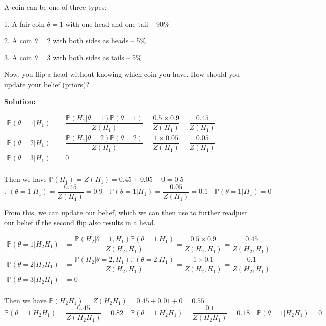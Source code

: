 \begin{eg}
  A coin can be one of three types:

  1. A fair coin \(\theta = 1\) with one head and one tail – 90\%

  2. A coin \(\theta = 2\) with both sides as heads – 5\%
  
  3. A coin \(\theta = 3\) with both sides as tails – 5\%

  Now, you flip a head without knowing which coin you have. How should you update your belief (priors)?

  \textbf{Solution:} 

  \(
  \begin{aligned}
    \mathbb{P}(\theta = 1 \vert H_1) &= \dfrac{\mathbb{P}(H_1 \vert \theta = 1)\mathbb{P}(\theta = 1)}{Z(H_1)} = \dfrac{0.5 \times 0.9}{Z(H_1)} = \dfrac{0.45}{Z(H_1)} \\
    \mathbb{P}(\theta = 2 \vert H_1) &= \dfrac{\mathbb{P}(H_1 \vert \theta = 2)\mathbb{P}(\theta = 2)}{Z(H_1)} = \dfrac{1 \times 0.05}{Z(H_1)} = \dfrac{0.05}{Z(H_1)} \\
    \mathbb{P}(\theta = 3 \vert H_1) &= 0 \\
  \end{aligned}
  \) 

  Then we have \(\mathbb{P}(H_1) = Z(H_1) = 0.45 + 0.05 + 0 = 0.5\) 
  \[
    \mathbb{P}(\theta = 1 \vert H_1) = \dfrac{0.45}{Z(H_1)} = 0.9 \quad \mathbb{P}(\theta = 1 \vert H_1) = \dfrac{0.05}{Z(H_1)} = 0.1 \quad \mathbb{P}(\theta = 1 \vert H_1) = 0
  \]

  From this, we can update our belief, which we can then use to further readjust our belief if the second flip also results in a head. 

  \(
  \begin{aligned}
    \mathbb{P}(\theta = 1 \vert H_2 H_1) &= \dfrac{\mathbb{P}(H_2 \vert \theta = 1, H_1)\mathbb{P}(\theta = 1 \vert H_1)}{Z(H_2, H_1)} = \dfrac{0.5 \times 0.9}{Z(H_2, H_1)} = \dfrac{0.45}{Z(H_2, H_1)} \\
    \mathbb{P}(\theta = 2 \vert H_2 H_1) &= \dfrac{\mathbb{P}(H_2 \vert \theta = 2, H_1)\mathbb{P}(\theta = 2 \vert H_1)}{Z(H_2, H_1)} = \dfrac{1 \times 0.1}{Z(H_2, H_1)} = \dfrac{0.1}{Z(H_2, H_1)} \\
    \mathbb{P}(\theta = 3 \vert H_2 H_1) &= 0 \\
  \end{aligned}
  \) 

  Then we have \(\mathbb{P}(H_2 H_1) = Z(H_2 H_1) = 0.45 + 0.01 + 0 = 0.55\) 
  \[
    \mathbb{P}(\theta = 1 \vert H_2 H_1) = \dfrac{0.45}{Z(H_2 H_1)} = 0.82 \quad \mathbb{P}(\theta = 1 \vert H_2 H_1) = \dfrac{0.1}{Z(H_2 H_1)} = 0.18 \quad \mathbb{P}(\theta = 1 \vert H_2 H_1) = 0
  \]
\end{eg}

